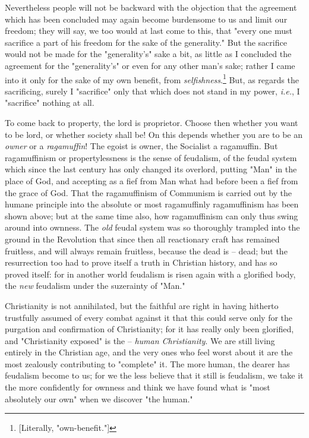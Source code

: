 Nevertheless people will not be backward with the objection that the agreement 
which has been concluded may again become burdensome to us and limit our 
freedom; they will say, we too would at last come to this, that "{}every one 
must sacrifice a part of his freedom for the sake of the generality."{} But 
the sacrifice would not be made for the "{}generality's"{} sake a bit, as 
little as I concluded the agreement for the "{}generality's"{} or even for any 
other man's sake; rather I came into it only for the sake of my own benefit, 
from \textit{selfishness}.\footnote{[Literally, "{}own-benefit."{}]} But, as 
regards the sacrificing, surely I "{}sacrifice"{} only that which does not 
stand in my power, \textit{i.e.}, I "{}sacrifice"{} nothing at all.

To come back to property, the lord is proprietor. Choose then whether you want 
to be lord, or whether society shall be! On this depends whether you are to be 
an \textit{owner} or a \textit{ragamuffin}! The egoist is owner, the Socialist 
a ragamuffin. But ragamuffinism or propertylessness is the sense of feudalism, 
of the feudal system which since the last century has only changed its 
overlord, putting "{}Man"{} in the place of God, and accepting as a fief from 
Man what had before been a fief from the grace of God. That the ragamuffinism 
of Communism is carried out by the humane principle into the absolute or most 
ragamuffinly ragamuffinism has been shown above; but at the same time also, 
how ragamuffinism can only thus swing around into ownness. The \textit{old} 
feudal system was so thoroughly trampled into the ground in the Revolution 
that since then all reactionary craft has remained fruitless, and will always 
remain fruitless, because the dead is -- dead; but the resurrection too had to 
prove itself a truth in Christian history, and has so proved itself: for in 
another world feudalism is risen again with a glorified body, the \textit{new} 
feudalism under the suzerainty of "{}Man."{}

Christianity is not annihilated, but the faithful are right in having hitherto 
trustfully assumed of every combat against it that this could serve only for 
the purgation and confirmation of Christianity; for it has really only been 
glorified, and "{}Christianity exposed"{} is the -- \textit{human 
Christianity}. We are still living entirely in the Christian age, and the very 
ones who feel worst about it are the most zealously contributing to 
"{}complete"{} it. The more human, the dearer has feudalism become to us; for 
we the less believe that it still is feudalism, we take it the more 
confidently for ownness and think we have found what is "{}most absolutely our 
own"{} when we discover "{}the human."{}

